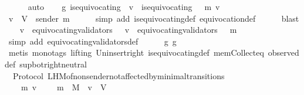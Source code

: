 \begin{isabellebody}
\ \ \ \ \isamarkupfalse%
\ auto\isanewline
\ \ \isamarkupfalse%
\ g{}{\isacharcolon}\ {\isachardoublequoteopen}is{\isacharunderscore}equivocating\ {\isasymsigma}\ v\ {\isacharequal}\ is{\isacharunderscore}equivocating\ {\isacharparenleft}{\isasymsigma}\ {\isasymunion}\ {\isacharbraceleft}m{\isacharbraceright}{\isacharparenright}\ v{\isachardoublequoteclose}\isanewline
\ \ \ \ \isamarkupfalse%
\ {\isacartoucheopen}v\ {\isasymin}\ V\ {\isacharminus}\ {\isacharbraceleft}sender\ m{\isacharbraceright}{\isacartoucheclose}\isanewline
\ \ \ \ \isamarkupfalse%
\ {\isacharparenleft}simp\ add{\isacharcolon}\ is{\isacharunderscore}equivocating{\isacharunderscore}def\ equivocation{\isacharunderscore}def{\isacharparenright}\isanewline
\ \ \ \ \isamarkupfalse%
\ blast\isanewline
\ \ \isamarkupfalse%
\ {\isachardoublequoteopen}{\isacharparenleft}v\ {\isasymin}\ equivocating{\isacharunderscore}validators\ {\isasymsigma}{\isacharparenright}\ {\isacharequal}\ {\isacharparenleft}v\ {\isasymin}\ equivocating{\isacharunderscore}validators\ {\isacharparenleft}{\isasymsigma}\ {\isasymunion}\ {\isacharbraceleft}m{\isacharbraceright}{\isacharparenright}{\isacharparenright}{\isachardoublequoteclose}\isanewline
\ \ \ \ \isamarkupfalse%
\ {\isacharparenleft}simp\ add{\isacharcolon}\ equivocating{\isacharunderscore}validators{\isacharunderscore}def{\isacharparenright}\isanewline
\ \ \ \ \isamarkupfalse%
\ g{}\ g{}\isanewline
\ \ \ \ \isamarkupfalse%
\ {\isacharparenleft}metis\ {\isacharparenleft}mono{\isacharunderscore}tags{\isacharcomma}\ lifting{\isacharparenright}\ Un{\isacharunderscore}insert{\isacharunderscore}right\ is{\isacharunderscore}equivocating{\isacharunderscore}def\ mem{\isacharunderscore}Collect{\isacharunderscore}eq\ observed{\isacharunderscore}def\ sup{\isacharunderscore}bot{\isachardot}right{\isacharunderscore}neutral{\isacharparenright}\isanewline
{}\isamarkupfalse%
%
\endisatagproof
{\isafoldproof}%
%
\isadelimproof
\isanewline
%
\endisadelimproof
\isanewline
\isanewline
{}\isamarkupfalse%
\ {\isacharparenleft}\ Protocol{\isacharparenright}\ L{\isacharunderscore}H{\isacharunderscore}M{\isacharunderscore}of{\isacharunderscore}non{\isacharunderscore}sender{\isacharunderscore}not{\isacharunderscore}affected{\isacharunderscore}by{\isacharunderscore}minimal{\isacharunderscore}transitions\ {\isacharcolon}\isanewline
\ \ {\isachardoublequoteopen}{\isasymforall}\ {\isasymsigma}\ m\ v{\isachardot}\ {\isasymsigma}\ {\isasymin}\ {\isasymSigma}\ {\isasymand}\ m\ {\isasymin}\ M\ {\isasymand}\ v\ {\isasymin}\ V\ \isanewline

\end{isabellebody}
